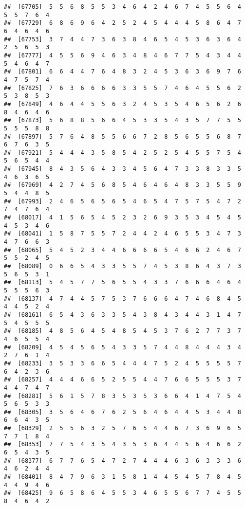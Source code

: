 \documentclass[
]{book}
\begin{document}
\begin{verbatim}
##  [67705]  5  5  6  8  5  5  3  4  6  4  2  4  6  7  4  5  5  6  4  5  5  7  6  4
##  [67729]  6  8  6  9  6  4  2  5  2  4  5  4  4  4  5  8  6  4  7  6  4  6  4  6
##  [67753]  3  7  4  4  7  3  6  3  8  4  6  5  4  5  3  6  3  6  4  2  5  6  5  3
##  [67777]  4  5  5  6  9  4  6  3  4  8  4  6  7  7  5  4  3  4  4  5  4  6  4  7
##  [67801]  6  6  4  4  7  6  4  8  3  2  4  5  3  6  3  6  9  7  6  4  7  5  7  4
##  [67825]  7  6  3  6  6  6  6  3  3  5  5  7  4  6  4  5  5  6  2  5  3  8  5  3
##  [67849]  4  6  4  4  5  5  6  3  2  4  5  3  5  4  6  5  6  2  6  8  4  6  4  6
##  [67873]  5  6  8  8  5  6  6  4  5  3  3  5  4  3  5  7  7  5  5  5  5  5  8  8
##  [67897]  5  7  6  4  8  5  5  6  6  7  2  8  5  6  5  5  6  8  7  6  7  6  3  5
##  [67921]  5  4  4  4  3  5  8  5  4  2  5  2  5  4  5  5  7  5  4  5  6  5  4  4
##  [67945]  8  4  3  5  6  4  3  3  4  5  6  4  7  3  3  8  3  3  5  4  6  3  6  5
##  [67969]  4  2  7  4  5  6  8  5  4  6  4  6  4  8  3  3  5  5  9  5  4  4  8  5
##  [67993]  2  4  6  5  6  5  6  5  4  6  5  4  7  5  7  5  4  7  2  7  4  7  6  4
##  [68017]  4  1  5  6  5  4  5  2  3  2  6  9  3  5  3  4  5  4  5  4  5  3  4  6
##  [68041]  1  5  8  7  5  5  7  2  4  4  2  4  6  5  5  3  4  7  3  4  7  6  6  3
##  [68065]  5  4  5  2  3  4  4  6  6  6  6  5  4  6  6  2  4  6  7  5  5  2  4  5
##  [68089]  0  6  6  5  4  3  3  5  5  7  4  5  3  8  6  4  3  7  3  5  6  5  3  1
##  [68113]  5  4  5  7  7  5  6  5  5  4  3  3  7  6  6  6  4  6  4  5  5  5  6  3
##  [68137]  4  7  4  4  5  7  5  3  7  6  6  6  4  7  4  6  8  4  5  4  4  5  2  4
##  [68161]  6  5  4  3  6  3  3  5  4  3  8  4  3  4  4  3  1  4  7  5  4  5  5  5
##  [68185]  4  8  5  6  4  5  4  8  5  4  5  3  7  6  2  7  7  3  7  4  6  5  5  4
##  [68209]  4  5  4  5  6  5  4  3  3  5  7  4  4  8  4  4  4  3  4  2  7  6  1  4
##  [68233]  3  5  3  3  6  6  5  4  4  4  7  5  2  4  5  5  5  5  7  6  4  2  3  6
##  [68257]  4  4  4  6  6  5  2  5  5  4  4  7  6  6  5  5  5  3  7  4  4  7  4  7
##  [68281]  5  6  1  5  7  8  3  5  3  5  3  6  6  4  1  4  7  5  4  5  6  5  3  3
##  [68305]  3  5  6  4  6  7  6  2  5  6  4  6  4  4  5  3  4  4  8  6  6  4  3  5
##  [68329]  2  5  5  6  3  2  5  7  6  5  4  4  6  7  3  6  9  6  5  7  7  1  8  4
##  [68353]  7  7  5  4  3  5  4  3  5  3  6  4  4  5  6  4  6  6  2  6  5  4  3  5
##  [68377]  6  7  7  6  5  4  7  2  7  4  4  4  6  3  6  3  3  3  6  4  6  2  4  4
##  [68401]  8  4  7  9  6  3  1  5  8  1  4  4  5  4  5  7  8  4  5  4  4  9  4  6
##  [68425]  9  6  5  8  6  4  5  5  3  4  6  5  5  6  7  7  4  5  5  8  4  6  4  2

\end{verbatim}
\end{document}
